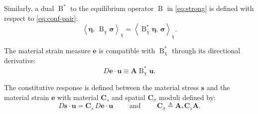 \begin{description}
Similarly, a dual
\(\operatorname{B}^*\) to the equilibrium operator \(\operatorname{B}\) in
\eqref{eq:strong} is defined with respect to \eqref{eq:conf-pair}:
\begin{equation}
  \left<\boldsymbol{\eta},\, \operatorname{B}_\chi\boldsymbol{\sigma}\right>_\chi = \left<\operatorname{B}_\chi^*\boldsymbol{\eta},\, \boldsymbol{\sigma}\right>_\chi.
  \label{eq:def-adjoint}
\end{equation}
\item[A3]
The material strain measure \(\boldsymbol{e}\) is compatible with
\(\operatorname{B}^*_\chi\) through its directional derivative: 
\begin{equation}
  D\boldsymbol{e}\cdot\boldsymbol{u} \equiv \boldsymbol{A}\operatorname{B}^*_\chi \boldsymbol{u}.
  \label{eq:vstrain}
\end{equation}
%
\item[A4]
The constitutive response is defined between the material stress
\(\boldsymbol{s}\) and the material strain \(\boldsymbol{e}\) with material \(\boldsymbol{C}_s\) and
spatial \(\boldsymbol{C}_\sigma\) moduli defined by:
\begin{equation}
  D \boldsymbol{s}\cdot \boldsymbol{u} = \boldsymbol{C}_s \, D \boldsymbol{e}\cdot {\boldsymbol{u}}
  \qquad\text{ and }\qquad
  \boldsymbol{C}_\sigma \triangleq \boldsymbol{A}_*\boldsymbol{C}_s\boldsymbol{A}.
  \label{eq:def-moduli}
\end{equation}
\end{description}
\fi 
